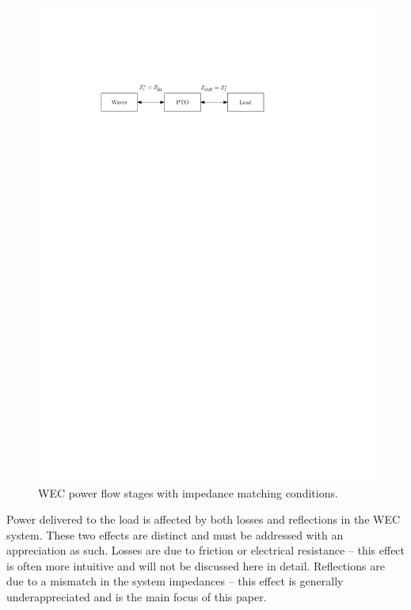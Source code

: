 \documentclass[twocolumn]{autart}
\begin{document}
\begin{figure}[tb]
        \centering
        \includegraphics[width=1\columnwidth]{wec_as_multiport_power_transfer_stages.pdf}
        \caption{WEC power flow stages with impedance matching conditions.}
        \label{fig:wec_as_multiport_power_transfer_stages}
\end{figure}

Power delivered to the load is affected by both losses and reflections in the WEC system.
These two effects are distinct and must be addressed with an appreciation as such.
Losses are due to friction or electrical resistance -- this effect is often more intuitive and will not be discussed here in detail.
Reflections are due to a mismatch in the system impedances -- this effect is generally underappreciated and is the main focus of this paper.
\end{document}
